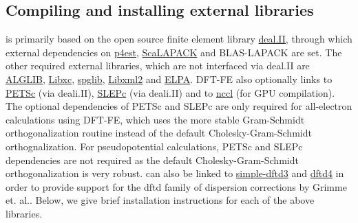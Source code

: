 \subsection{Compiling and installing external libraries}
\dftfe{} is primarily based on the open source finite element library \href{http://www.dealii.org/}{deal.II}, through which external dependencies
on \href{http://p4est.org/}{p4est}, \href{http://www.netlib.org/scalapack/}{ScaLAPACK} and BLAS-LAPACK are set. The other required external libraries, which are
not interfaced via deal.II are \href{http://www.alglib.net/}{ALGLIB}, \href{http://www.tddft.org/programs/libxc/}{Libxc}, \href{https://atztogo.github.io/spglib/}{spglib}, \href{http://www.xmlsoft.org/}{Libxml2} and \href{https://elpa.mpcdf.mpg.de/}{ELPA}. DFT-FE also optionally links to \href{https://www.mcs.anl.gov/petsc/}{PETSc} (via deali.II), \href{http://slepc.upv.es/}{SLEPc} (via deali.II) and to \href{https://developer.nvidia.com/nccl}{nccl} (for GPU compilation). The optional dependencies of PETSc and SLEPc are only required for all-electron calculations using DFT-FE, which uses the more stable Gram-Schmidt orthogonalization routine instead of the default Cholesky-Gram-Schmidt orthognalization. For pseudopotential calculations, PETSc and SLEPc dependencies are not required as the default Cholesky-Gram-Schmidt orthogonalization is very robust. \dftfe{} can also be linked to \href{https://github.com/awvwgk/simple-dftd3}{simple-dftd3} and \href{https://github.com/dftd4/dftd4}{dftd4} in order to provide support for the dftd family of dispersion corrections by Grimme et. al.. Below, we give brief installation instructions for each of the above libraries.
